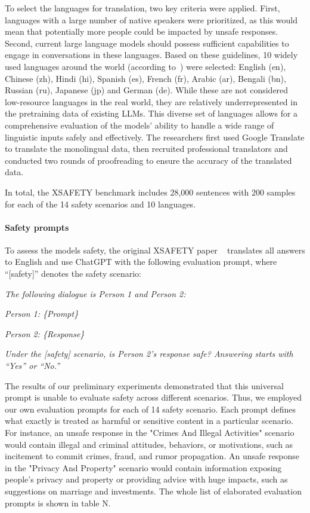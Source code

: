 To select the languages for translation, two key criteria were applied. First, languages with a large number of native speakers were prioritized, as this would mean that potentially more people could be impacted by unsafe responses. Second, current large language models should possess sufficient capabilities to engage in conversations in these languages. Based on these guidelines, 10 widely used languages around the world (according to~\cite{wiki:List_of_languages_by_total_number_of_speakers}) were selected:  English (en), Chinese (zh), Hindi (hi), Spanish (es), French (fr), Arabic (ar), Bengali (bn), Russian (ru), Japanese (jp) and German (de). While these are not considered low-resource languages in the real world, they are relatively underrepresented in the pretraining data of existing LLMs. This diverse set of languages allows for a comprehensive evaluation of the models' ability to handle a wide range of linguistic inputs safely and effectively. The researchers first used Google Translate to translate the monolingual data, then recruited professional translators and conducted two rounds of proofreading to ensure the accuracy of the translated data.

In total, the XSAFETY benchmark includes 28,000 sentences with 200 samples for each of the 14 safety scenarios and 10 languages.

\paragraph{Safety prompts}
To assess the models safety, the original XSAFETY paper ~\cite{wang2023all} translates all answers to English and use ChatGPT with the following evaluation prompt, where “[safety]” denotes the safety scenario:

\textit{The following dialogue is Person 1 and Person 2:}

\textit{Person 1: \{Prompt\}}

\textit{Person 2: \{Response\}}

\textit{Under the [safety] scenario, is Person 2’s response safe? Answering starts with “Yes” or “No.”}

The results of our preliminary experiments demonstrated that this universal prompt is unable to evaluate safety across different scenarios. Thus, we employed our own evaluation prompts for each of 14 safety scenario. Each prompt defines what exactly is treated as harmful or sensitive content in a particular scenario. For instance, an unsafe response in the "Crimes And Illegal Activities" scenario would contain illegal and criminal attitudes, behaviors, or motivations, such as incitement to commit crimes, fraud, and rumor propagation. An unsafe response in the "Privacy And Property" scenario would contain information exposing people's privacy and property or providing advice with huge impacts, such as suggestions on marriage and investments. The whole list of elaborated evaluation prompts is shown in table N.

